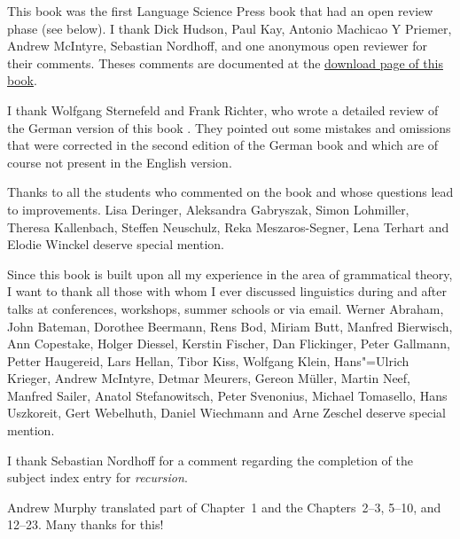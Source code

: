 This book was the first Language Science Press book that had an open review phase (see below). I
thank Dick Hudson, Paul Kay, Antonio Machicao Y Priemer, Andrew McIntyre, Sebastian Nordhoff, and one anonymous open
reviewer for their comments. Theses comments are documented at the \href{\lsURL}{download page of this book}.



I thank Wolfgang Sternefeld and Frank Richter, who wrote a detailed review of the German version of
this book \citep{SR2012a}. They pointed out some mistakes and omissions that were corrected in the second edition
of the German book and which are of course not present in the English version.

Thanks to all the students who commented on the book and whose questions lead to improvements. 
Lisa Deringer,
Aleksandra Gabryszak, %
Simon Lohmiller, %
Theresa Kallenbach, %
Steffen Neu\-schulz,  %
Reka Meszaros-Segner,
Lena Terhart and
Elodie Winckel deserve special mention.

Since this book is built upon all my experience in the area of grammatical theory, I want to thank
all those with whom I ever discussed linguistics during and after talks at conferences, workshops,
summer schools or via email.
Werner Abraham,
John Bateman,
Dorothee Beermann, 
Rens Bod, 
Miriam Butt,
Manfred Bierwisch,
Ann Copestake, 
Holger Diessel, 
Kerstin Fischer,
Dan Flickinger,
Peter Gallmann, 
Petter Haugereid,
Lars Hellan, 
Tibor Kiss,
Wolfgang Klein, 
Hans"=Ulrich Krieger,
Andrew McIntyre,
Detmar Meurers,
Gereon Müller,
Martin Neef,
Manfred Sailer, 
Anatol Stefanowitsch,
Peter Svenonius,
Michael Tomasello, 
Hans Uszkoreit, 
Gert Webelhuth, 
Daniel Wiechmann and Arne Zeschel deserve special mention.

I thank Sebastian Nordhoff for a comment regarding the completion of the subject index entry for \emph{recursion}.

Andrew Murphy translated part of Chapter~1 and the Chapters~2--3, 5--10, and 12--23. Many thanks for this!

